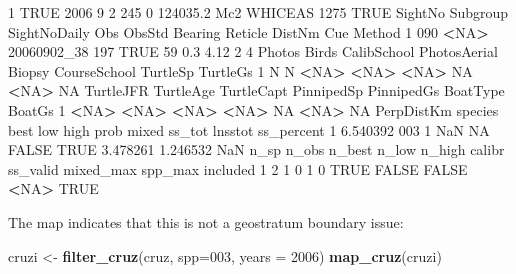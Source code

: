 \documentclass[
]{book}
\newenvironment{Shaded}{\begin{snugshade}}{\end{snugshade}}
\newcommand{\AttributeTok}[1]{\textcolor[rgb]{0.13,0.29,0.53}{#1}}
\newcommand{\ConstantTok}[1]{\textcolor[rgb]{0.56,0.35,0.01}{#1}}
\newcommand{\DecValTok}[1]{\textcolor[rgb]{0.00,0.00,0.81}{#1}}
\newcommand{\ErrorTok}[1]{\textcolor[rgb]{0.64,0.00,0.00}{\textbf{#1}}}
\newcommand{\FloatTok}[1]{\textcolor[rgb]{0.00,0.00,0.81}{#1}}
\newcommand{\FunctionTok}[1]{\textcolor[rgb]{0.13,0.29,0.53}{\textbf{#1}}}
\newcommand{\NormalTok}[1]{#1}
\newcommand{\OtherTok}[1]{\textcolor[rgb]{0.56,0.35,0.01}{#1}}
\newcommand{\SpecialCharTok}[1]{\textcolor[rgb]{0.81,0.36,0.00}{\textbf{#1}}}
\newcommand{\StringTok}[1]{\textcolor[rgb]{0.31,0.60,0.02}{#1}}
\begin{document}
\begin{Shaded}
\begin{Highlighting}[]
\DecValTok{1}            \ConstantTok{TRUE} \DecValTok{2006}     \DecValTok{9}   \DecValTok{2}  \DecValTok{245}      \DecValTok{0} \FloatTok{124035.2}\NormalTok{  Mc2 WHICEAS   }\DecValTok{1275} \ConstantTok{TRUE}
\NormalTok{  SightNo Subgroup SightNoDaily Obs ObsStd Bearing Reticle DistNm Cue Method}
\DecValTok{1}     \DecValTok{090}     \SpecialCharTok{\textless{}}\ConstantTok{NA}\SpecialCharTok{\textgreater{}}\NormalTok{  20060902\_38 }\DecValTok{197}   \ConstantTok{TRUE}      \DecValTok{59}     \FloatTok{0.3}   \FloatTok{4.12}   \DecValTok{2}      \DecValTok{4}
\NormalTok{  Photos Birds CalibSchool PhotosAerial Biopsy CourseSchool TurtleSp TurtleGs}
\DecValTok{1}\NormalTok{      N     N        }\SpecialCharTok{\textless{}}\ConstantTok{NA}\SpecialCharTok{\textgreater{}}         \ErrorTok{\textless{}}\ConstantTok{NA}\SpecialCharTok{\textgreater{}}   \ErrorTok{\textless{}}\ConstantTok{NA}\SpecialCharTok{\textgreater{}}           \ConstantTok{NA}     \SpecialCharTok{\textless{}}\ConstantTok{NA}\SpecialCharTok{\textgreater{}}       \ConstantTok{NA}
\NormalTok{  TurtleJFR TurtleAge TurtleCapt PinnipedSp PinnipedGs BoatType BoatGs}
\DecValTok{1}      \SpecialCharTok{\textless{}}\ConstantTok{NA}\SpecialCharTok{\textgreater{}}      \ErrorTok{\textless{}}\ConstantTok{NA}\SpecialCharTok{\textgreater{}}       \ErrorTok{\textless{}}\ConstantTok{NA}\SpecialCharTok{\textgreater{}}       \ErrorTok{\textless{}}\ConstantTok{NA}\SpecialCharTok{\textgreater{}}         \ConstantTok{NA}     \SpecialCharTok{\textless{}}\ConstantTok{NA}\SpecialCharTok{\textgreater{}}     \ConstantTok{NA}
\NormalTok{  PerpDistKm species best low high  prob mixed   ss\_tot  lnsstot ss\_percent}
\DecValTok{1}   \FloatTok{6.540392}     \DecValTok{003}    \DecValTok{1} \ConstantTok{NaN}   \ConstantTok{NA} \ConstantTok{FALSE}  \ConstantTok{TRUE} \FloatTok{3.478261} \FloatTok{1.246532}        \ConstantTok{NaN}
\NormalTok{  n\_sp n\_obs n\_best n\_low n\_high calibr ss\_valid mixed\_max spp\_max included}
\DecValTok{1}    \DecValTok{2}     \DecValTok{1}      \DecValTok{0}     \DecValTok{1}      \DecValTok{0}   \ConstantTok{TRUE}    \ConstantTok{FALSE}     \ConstantTok{FALSE}    \SpecialCharTok{\textless{}}\ConstantTok{NA}\SpecialCharTok{\textgreater{}}     \ConstantTok{TRUE}
\end{Highlighting}
\end{Shaded}

The map indicates that this is not a geostratum boundary issue:

\begin{Shaded}
\begin{Highlighting}[]
\NormalTok{cruzi }\OtherTok{\textless{}{-}} \FunctionTok{filter\_cruz}\NormalTok{(cruz, }\AttributeTok{spp=}\StringTok{\textquotesingle{}003\textquotesingle{}}\NormalTok{, }\AttributeTok{years =} \DecValTok{2006}\NormalTok{)}
\FunctionTok{map\_cruz}\NormalTok{(cruzi)}
\end{Highlighting}
\end{Shaded}
\end{document}
